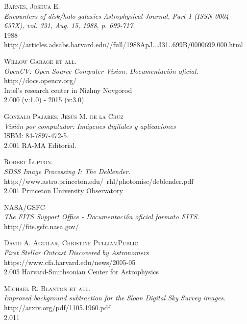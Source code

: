 	\begin{thebibliography}{1}
		\textsc{Barnes, Joshua E.} \\
		\textit{Encounters of disk/halo galaxies}
		\textit{Astrophysical Journal, Part 1 (ISSN 0004-637X), vol. 331, Aug. 15, 1988, p. 699-717.}
		\\1988
		\\http://articles.adsabs.harvard.edu//full/1988ApJ...331..699B/0000699.000.html
		
  		\textsc{Willow Garage et all.} \\
  		\textit{OpenCV: Open Source Computer Vision. Documentación oficial.}
  		\\http://docs.opencv.org/
		\\Intel's research center in Nizhny Novgorod
  		\\2.000 (v:1.0) - 2015 (v:3.0)

  		\textsc{Gonzalo Pajares, Jesús M. de la Cruz} \\
  		\textit{Visión por computador: Imágenes digitales y aplicaciones}
  		\\ISBM: 84-7897-472-5.
  		\\2.001 RA-MA Editorial.

	  	\textsc{Robert Lupton.} \\
	  	\textit{SDSS Image Processing I: The Deblender.}
	  	\\http://www.astro.princeton.edu/~rhl/photomisc/deblender.pdf
		\\2.001 Princeton University Observatory
	  
  		\textsc{NASA/GSFC} \\
  		\textit{The FITS Support Office - Documentación oficial formato FITS.}
  		\\http://fits.gsfc.nasa.gov/
	  	
	  		  	
	  	\textsc{ David A. Aguilar, Christine PulliamPublic } \\
	  	\textit{First Stellar Outcast Discovered by Astronomers}
	  	\\https://www.cfa.harvard.edu/news/2005-05
	  	\\2.005 Harvard-Smithsonian Center for Astrophysics
	  
  	  	\textsc{Michael R. Blanton et all.} \\
  	  	\textit{Improved background subtraction for the Sloan Digital Sky Survey images.}
  	  	\\http://arxiv.org/pdf/1105.1960.pdf 
  	  	\\2.011
	\end{thebibliography}
